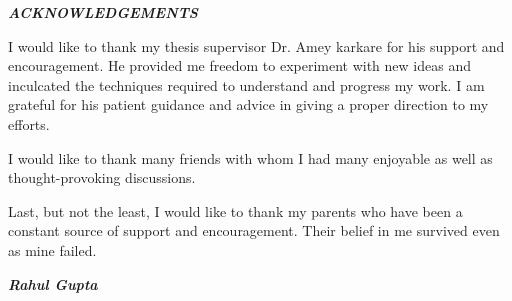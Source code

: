 \begin{center}
\begin{large}
{\it{\bf ACKNOWLEDGEMENTS} }
\end{large}
\end{center} 

I would like to thank my thesis supervisor Dr. Amey karkare for his support and encouragement. He provided me freedom to experiment with new ideas and inculcated the techniques required to understand and progress my work. I am grateful for his patient guidance and advice in giving a proper direction to my efforts. 

I would like to thank many friends with whom I had many enjoyable as well as thought-provoking discussions. 

Last, but not the least, I would like to thank my parents who have been a constant source of support and encouragement. Their belief in me survived even as mine failed.
\vskip 4mm
\begin{flushright}
\textit{\textbf{Rahul Gupta}}
\end{flushright}
